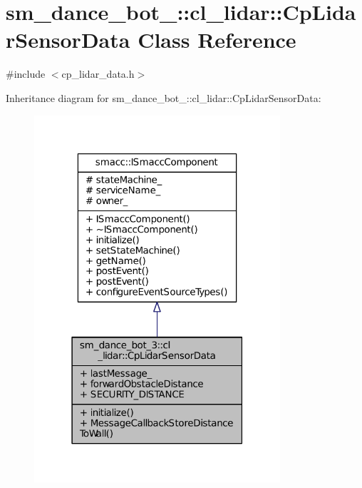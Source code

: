 \hypertarget{classsm__dance__bot__3_1_1cl__lidar_1_1CpLidarSensorData}{}\section{sm\+\_\+dance\+\_\+bot\+\_\+:\+:cl\+\_\+lidar\+:\+:Cp\+Lidar\+Sensor\+Data Class Reference}
\label{classsm__dance__bot__3_1_1cl__lidar_1_1CpLidarSensorData}


{\ttfamily \#include $<$cp\+\_\+lidar\+\_\+data.\+h$>$}



Inheritance diagram for sm\+\_\+dance\+\_\+bot\+\_\+:\+:cl\+\_\+lidar\+:\+:Cp\+Lidar\+Sensor\+Data\+:
\nopagebreak
\begin{figure}[H]
\begin{center}
\leavevmode
\includegraphics[width=259pt]{classsm__dance__bot__3_1_1cl__lidar_1_1CpLidarSensorData__inherit__graph}
\end{center}
\end{figure}


